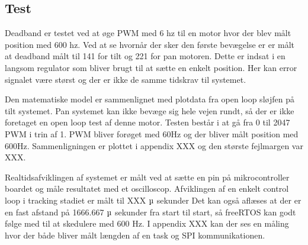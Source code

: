 




\subsection{Test} 
% 

Deadband er testet ved at øge PWM med 6 hz til en motor hvor der blev målt position med 600 hz.
Ved at se hvornår der sker den første bevægelse er er målt at deadband målt til 141 for tilt og 221 for pan motoren.
Dette er indsat i en langsom regulator som bliver brugt til at sætte en enkelt position. Her kan error signalet være størst og der er ikke de samme tidskrav til systemet. 

Den matematiske model er sammenlignet med plotdata fra open loop sløjfen på tilt systemet.
Pan systemet kan ikke bevæge sig hele vejen rundt, så der er ikke foretaget en open loop test af denne motor.
Testen består i at gå fra 0 til 2047 PWM i trin af 1. PWM bliver forøget med 60Hz og der bliver målt position med 600Hz.
Sammenligningen er plottet i appendix XXX og den største fejlmargen var XXX.


Realtidsafviklingen af systemet er målt ved at sætte en pin på mikrocontroller boardet og måle resultatet med et oscilloscop.
Afviklingen af en enkelt control loop i tracking stadiet er målt til XXX \(\micro\) sekunder
Det kan også aflæses at der er en fast afstand på 1666.667 \(\micro\) sekunder fra start til start, så freeRTOS kan godt følge med til at skedulere med 600 Hz.
I appendix XXX kan der ses en måling hvor der både bliver målt længden af en task og SPI kommunikationen.


